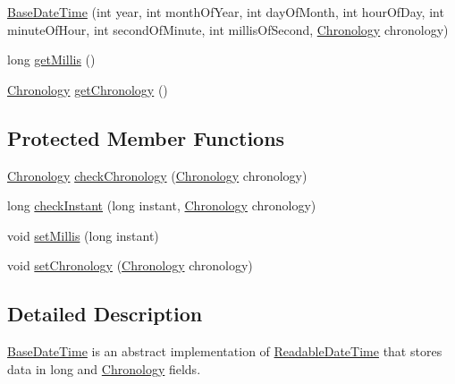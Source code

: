 \begin{DoxyCompactItemize}
\item 
\hyperlink{classorg_1_1joda_1_1time_1_1base_1_1_base_date_time_a35cb445193f5636f61b7d9ed224b246a}{Base\-Date\-Time} (int year, int month\-Of\-Year, int day\-Of\-Month, int hour\-Of\-Day, int minute\-Of\-Hour, int second\-Of\-Minute, int millis\-Of\-Second, \hyperlink{classorg_1_1joda_1_1time_1_1_chronology}{Chronology} chronology)
\item 
long \hyperlink{classorg_1_1joda_1_1time_1_1base_1_1_base_date_time_ad2e67a0aad5efc311eeee75ee3447551}{get\-Millis} ()
\item 
\hyperlink{classorg_1_1joda_1_1time_1_1_chronology}{Chronology} \hyperlink{classorg_1_1joda_1_1time_1_1base_1_1_base_date_time_ae6561de2895ddf6ce1fa84f16226b04a}{get\-Chronology} ()
\end{DoxyCompactItemize}
\subsection*{Protected Member Functions}
\begin{DoxyCompactItemize}
\item 
\hyperlink{classorg_1_1joda_1_1time_1_1_chronology}{Chronology} \hyperlink{classorg_1_1joda_1_1time_1_1base_1_1_base_date_time_a9af37c7305919f9204bee7f411624b06}{check\-Chronology} (\hyperlink{classorg_1_1joda_1_1time_1_1_chronology}{Chronology} chronology)
\item 
long \hyperlink{classorg_1_1joda_1_1time_1_1base_1_1_base_date_time_a7d8ff8ff59382105699788446f7656b1}{check\-Instant} (long instant, \hyperlink{classorg_1_1joda_1_1time_1_1_chronology}{Chronology} chronology)
\item 
void \hyperlink{classorg_1_1joda_1_1time_1_1base_1_1_base_date_time_a7f7c5a7da6fc9e20020a447f0919ea47}{set\-Millis} (long instant)
\item 
void \hyperlink{classorg_1_1joda_1_1time_1_1base_1_1_base_date_time_a15f2098c0553cbef890a6cedf2f2aa0d}{set\-Chronology} (\hyperlink{classorg_1_1joda_1_1time_1_1_chronology}{Chronology} chronology)
\end{DoxyCompactItemize}


\subsection{Detailed Description}
\hyperlink{classorg_1_1joda_1_1time_1_1base_1_1_base_date_time}{Base\-Date\-Time} is an abstract implementation of \hyperlink{interfaceorg_1_1joda_1_1time_1_1_readable_date_time}{Readable\-Date\-Time} that stores data in {\ttfamily long} and {\ttfamily \hyperlink{classorg_1_1joda_1_1time_1_1_chronology}{Chronology}} fields. 


